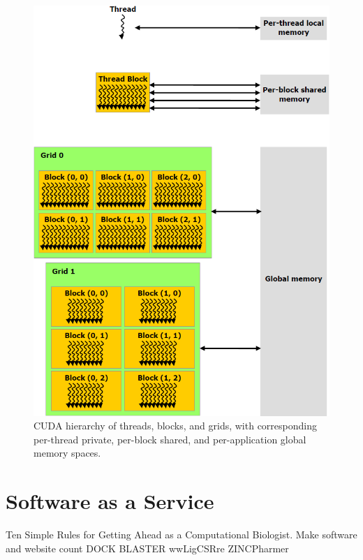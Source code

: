 \begin{figure}
\centering
\includegraphics[width=\textwidth]{GPU/CUDAMemoryHierarchy.png}
\caption{CUDA hierarchy of threads, blocks, and grids, with corresponding per-thread private, per-block shared, and per-application global memory spaces.}
\label{GPU:CUDAMemoryHierarchy}
\end{figure}

\section{Software as a Service}

Ten Simple Rules for Getting Ahead as a Computational Biologist. Make software and website count \citep{260}
DOCK BLASTER
wwLigCSRre
ZINCPharmer


\chapterend
